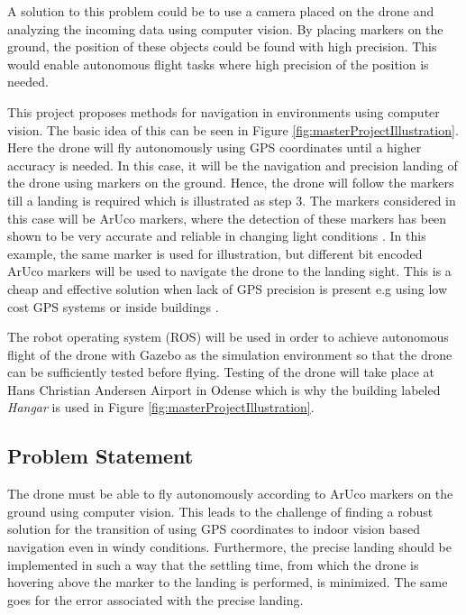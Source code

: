 \documentclass[../Head/Report.tex]{subfiles}
\begin{document}
A solution to this problem could be to use a camera placed on the drone and analyzing the incoming data using computer vision. By placing markers on the ground, the position of these objects could be found with high precision. This would enable autonomous flight tasks where high precision of the position is needed.      

This project proposes methods for navigation in environments using computer vision. The basic idea of this can be seen in Figure \ref{fig:masterProjectIllustration}. Here the drone will fly autonomously using GPS coordinates until a higher accuracy is needed. In this case, it will be the navigation and precision landing of the drone using markers on the ground. Hence, the drone will follow the markers till a landing is required which is illustrated as step 3. The markers considered in this case will be ArUco markers, where the detection of these markers has been shown to be very accurate and reliable in changing light conditions \cite{visualmarkers}. In this example, the same marker is used for illustration, but different bit encoded ArUco markers will be used to navigate the drone to the landing sight. This is a cheap and effective solution when lack of GPS precision is present e.g using low cost GPS systems or inside buildings \cite{Visual-Inertial-Navigation}. 

The robot operating system (ROS) will be used in order to achieve autonomous flight of the drone with Gazebo as the simulation environment so that the drone can be sufficiently tested before flying. Testing of the drone will take place at Hans Christian Andersen Airport in Odense which is why the building labeled \textit{Hangar} is used in Figure \ref{fig:masterProjectIllustration}.    

\subsection{Problem Statement}

The drone must be able to fly autonomously according to ArUco markers on the ground using computer vision. This leads to the challenge of finding a robust solution for the transition of using GPS coordinates to indoor vision based navigation even in windy conditions. Furthermore, the precise landing should be implemented in such a way that the settling time, from which the drone is hovering above the marker to the landing is performed, is minimized. The same goes for the error associated with the precise landing.  
\end{document}
